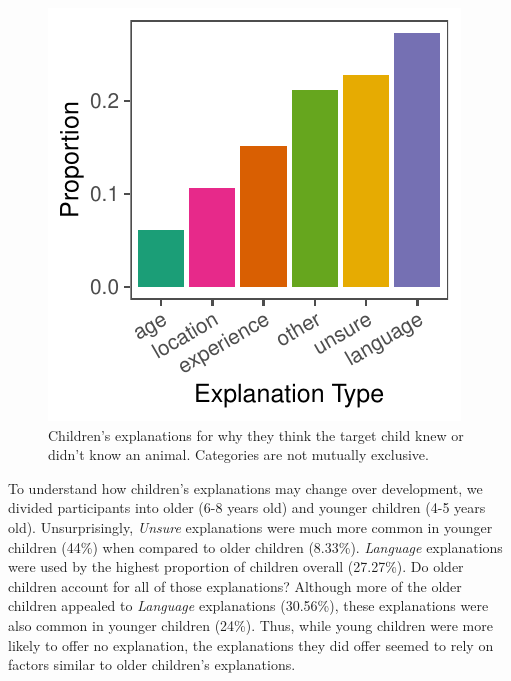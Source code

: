 \documentclass[10pt, letterpaper]{article}
\newenvironment{CodeChunk}{}{}
\begin{document}
\begin{CodeChunk}
\begin{figure}[tb]

{\centering \includegraphics{figs/explanations-1} 

}

\caption[Children's explanations for why they think the target child knew or didn't know an animal]{Children's explanations for why they think the target child knew or didn't know an animal. Categories are not mutually exclusive.}\label{fig:explanations}
\end{figure}
\end{CodeChunk}

To understand how children's explanations may change over development,
we divided participants into older (6-8 years old) and younger children
(4-5 years old). Unsurprisingly, \emph{Unsure} explanations were much
more common in younger children (44\%) when compared to older children
(8.33\%). \emph{Language} explanations were used by the highest
proportion of children overall (27.27\%). Do older children account for
all of those explanations? Although more of the older children appealed
to \emph{Language} explanations (30.56\%), these explanations were also
common in younger children (24\%). Thus, while young children were more
likely to offer no explanation, the explanations they did offer seemed
to rely on factors similar to older children's explanations.
\end{document}

